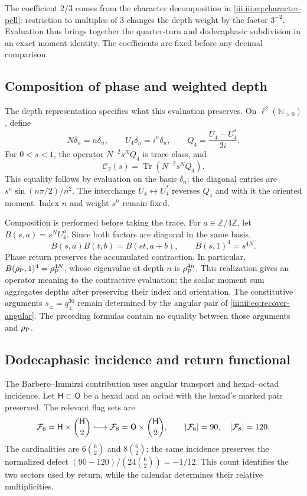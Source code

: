 The coefficient $2/3$ comes from the character decomposition in
\eqref{iii:iii:eq:character-pell}: restriction to multiples of $3$
changes the depth weight by the factor $3^{-2}$. Evaluation
thus brings together the quarter-turn and dodecaphasic subdivision in an
exact moment identity. The coefficients are fixed before any
decimal comparison.

\subsection{Composition of phase and weighted depth}

The depth representation specifies what this evaluation preserves.
On $\ell^2(\mathbb N_{>0})$, define
\[
 N\delta_n=n\delta_n,\qquad U_4\delta_n=i^n\delta_n,
 \qquad Q_4=\frac{U_4-U_4^*}{2i}.
\]
For $0<s<1$, the operator $N^{-2}s^NQ_4$ is trace class, and
\begin{equation}
 \mathcal C_2(s)=\operatorname{Tr}(N^{-2}s^NQ_4).
 \label{iii:iii:eq:pell-depth-trace}
\end{equation}
This equality follows by evaluation on the basis $\delta_n$; the
diagonal entries are $s^n\sin(n\pi/2)/n^2$. The interchange
$U_4\leftrightarrow U_4^*$ reverses $Q_4$ and with it the oriented
moment. Index $n$ and weight $s^n$ remain fixed.

Composition is performed before taking the trace. For
$a\in\mathbb Z/4\mathbb Z$, let $B(s,a)=s^NU_4^a$. Since both
factors are diagonal in the same basis,
\begin{equation}
 B(s,a)B(t,b)=B(st,a+b),\qquad
 B(s,1)^4=s^{4N}.
 \label{iii:iii:eq:pell-depth-composition}
\end{equation}
Phase return preserves the accumulated contraction. In particular,
$B(\rho_{\rm P},1)^4=\rho_{\rm P}^{4N}$, whose eigenvalue at depth
$n$ is $\rho_{\rm P}^{4n}$. This realization gives an operator
meaning to the contractive evaluation; the scalar moment sum
aggregates depths after preserving their index and orientation.
The constitutive arguments $s_\pm=q_\pm^{30}$ remain determined by
the angular pair of \eqref{iii:iii:eq:recover-angular}. The preceding formulas
contain no equality between those arguments and $\rho_{\rm P}$.

\subsection{Dodecaphasic incidence and return functional}

The Barbero--Immirzi contribution uses angular transport and
hexad--octad incidence. Let $\mathsf H\subset\mathsf O$ be a hexad
and an octad with the hexad's marked pair preserved. The relevant flag
sets are
\begin{equation}
 \mathcal F_6=\mathsf H\times\binom{\mathsf H}{2}
 \lhook\joinrel\longrightarrow
 \mathcal F_8=\mathsf O\times\binom{\mathsf H}{2},
 \qquad |\mathcal F_6|=90,\quad |\mathcal F_8|=120.
 \label{iii:iii:eq:barbero-flags}
\end{equation}
The cardinalities are $6\binom62$ and $8\binom62$; the same incidence
preserves the normalized defect
$(90-120)/(24\binom62)=-1/12$. This count identifies the two sectors
used by return, while the calendar determines their
relative multiplicities.

